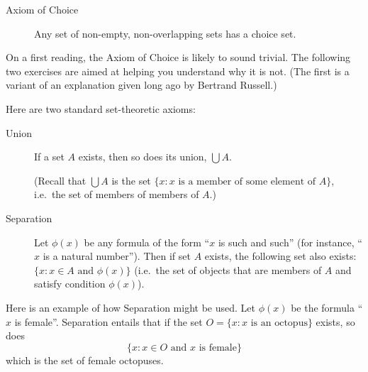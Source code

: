 \documentclass[12pt,letterpaper]{article}
\begin{document}
\begin{description}
\item[Axiom of Choice]
Any set of non-empty, non-overlapping sets has a choice set.
\end{description}


On a first reading, the Axiom of Choice is likely to sound trivial. The following two exercises are aimed at helping you understand why it is not. (The first is a variant of an explanation given long ago by Bertrand Russell.)

Here are two standard set-theoretic axioms:

\begin{description}

\item[Union]
If a set $A$ exists, then so does its union, $\bigcup A$. 

(Recall that $\bigcup A$ is the set $\{x : \text{$x$ is a member of some element of $A$}\}$, i.e.~the set of members of members of $A$.)


\item[Separation]
Let $\phi(x)$ be any formula of the form ``$x$ is such and such'' (for instance, ``$x$ is a natural number''). Then if set $A$ exists, the following set also exists: $\{x : x \in A \text{ and } \phi(x)\}$ (i.e.~the set of objects that are members of $A$ and satisfy condition $\phi(x)$).


\end{description}
Here is an example of how Separation might be used. Let $\phi(x)$ be the formula ``$x$ is female''. Separation entails that if the set $O = \{x : \text{$x$ is an octopus}\}$ exists, so does 
\[\{x : x \in O \text{ and $x$ is female}\}\]
which is the set of female octopuses.

\clearpage
\end{document}

